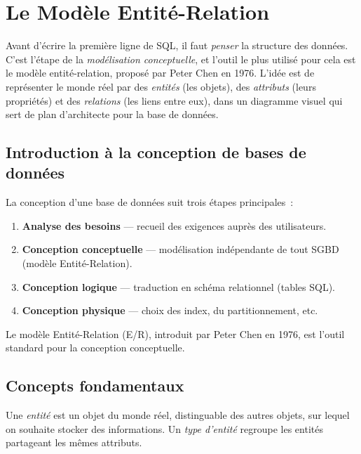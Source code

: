 \chapter{Le Mod\`ele Entit\'e-Relation}
\label{ch:entite_relation}

Avant d'\'ecrire la premi\`ere ligne de SQL, il faut \emph{penser} la
structure des donn\'ees. C'est l'\'etape de la \emph{mod\'elisation
conceptuelle}, et l'outil le plus utilis\'e pour cela est le mod\`ele
entit\'e-relation, propos\'e par Peter Chen en 1976. L'id\'ee est de
repr\'esenter le monde r\'eel par des \emph{entit\'es} (les objets), des
\emph{attributs} (leurs propri\'et\'es) et des \emph{relations} (les liens
entre eux), dans un diagramme visuel qui sert de plan d'architecte pour la
base de donn\'ees.

\section{Introduction \`a la conception de bases de donn\'ees}

La conception d'une base de donn\'ees suit trois \'etapes principales~:
\begin{enumerate}
    \item \textbf{Analyse des besoins} --- recueil des exigences aupr\`es des utilisateurs.
    \item \textbf{Conception conceptuelle} --- mod\'elisation ind\'ependante de tout SGBD
          (mod\`ele Entit\'e-Relation).
    \item \textbf{Conception logique} --- traduction en sch\'ema relationnel (tables SQL).
    \item \textbf{Conception physique} --- choix des index, du partitionnement, etc.
\end{enumerate}

Le mod\`ele Entit\'e-Relation (E/R), introduit par Peter Chen en 1976, est
l'outil standard pour la conception conceptuelle.

\section{Concepts fondamentaux}

\begin{definition}[Entit\'e]
Une \emph{entit\'e} est un objet du monde r\'eel, distinguable des autres objets,
sur lequel on souhaite stocker des informations. Un \emph{type d'entit\'e}
regroupe les entit\'es partageant les m\^emes attributs.
\end{definition}

